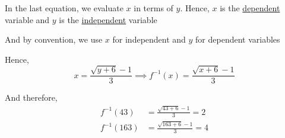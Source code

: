 \documentclass[14pt,fleqn]{extarticle}
\begin{document}
\begin{problem}
\begin{step}
In the last equation, we evaluate $x$ in terms of $y$. Hence, $x$ is the \underline{dependent} variable and $y$ is the \underline{independent} variable\newline 

And by convention, we use $x$ for independent and $y$ for dependent variables\newline 

Hence, 
\[ x = \frac{\sqrt{y+6}-1}{3} \implies f^{-1}(x) = \frac{\sqrt{x+6}-1}{3} \]

And therefore, 
\begin{align}
f^{-1}(43) &= \frac{\sqrt{43+6}-1}{3} = 2 \\[5pt]
f^{-1}(163) &= \frac{\sqrt{163+6}-1}{3} = 4 
\end{align}
\end{step}
\end{problem} 
\end{document}
